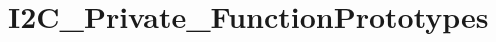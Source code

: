 \hypertarget{group___i2_c___private___function_prototypes}{\section{I2\-C\-\_\-\-Private\-\_\-\-Function\-Prototypes}
\label{group___i2_c___private___function_prototypes}
}
